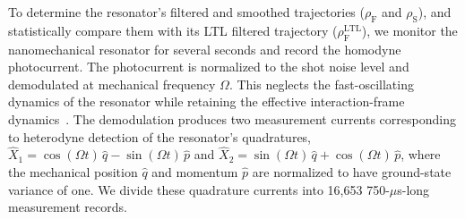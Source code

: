 \documentclass[aps,prx,twocolumn,amsmath,amssymb,superscriptaddress,floatfix,longbibliography
]{revtex4-2}
\begin{document}
To determine the resonator’s filtered and smoothed trajectories ($\rho_\text{F}$ and $\rho_\text{S}$), and statistically compare them with its LTL filtered trajectory ($\rho_\text{F}^\text{LTL}$), we monitor the nanomechanical resonator for several seconds and record the homodyne photocurrent.  
%
%
% 
The photocurrent is normalized to the shot noise level and demodulated at mechanical frequency $\Omega$. This neglects the fast-oscillating dynamics of the resonator while retaining the effective interaction-frame dynamics~\cite{doherty2012quantum}. The demodulation produces two measurement currents corresponding to heterodyne detection of the resonator’s quadratures, $\hat X_{1}=\cos(\Omega t)\,\hat q-\sin(\Omega t)\,\hat p$ and $\hat X_{2}=\sin(\Omega t)\,\hat q+\cos(\Omega t)\,\hat p$, where the mechanical position $\hat{q}$ and momentum $\hat{p}$ are normalized to have ground-state variance of one. We divide these quadrature currents into 16,653 750-$\mu$s-long measurement records. 
\end{document}

